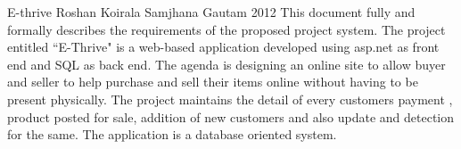  \begin{conf-abstract}[]
{E-thrive}
{
Roshan Koirala
Samjhana Gautam
}
{2012}
This document fully and formally describes the requirements of the proposed
project system. The project entitled ``E-Thrive" is a web-based application
developed using asp.net as front end and SQL as back end. The agenda is
designing an online site to allow buyer and seller to help purchase and sell
their items online without having to be present physically. The project maintains
the detail of every customers payment , product posted for sale, addition of new
customers and also update and detection for the same. The application is a
database oriented system.
  \end{conf-abstract}